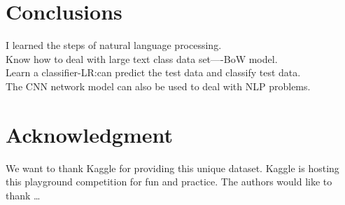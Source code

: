 \section{Conclusions} \label{sec-conclusions}
I learned the steps of natural language processing.\\
 Know how to deal with large text class data set—-BoW model.\\
Learn a classifier-LR:can predict the test data and classify test data.\\
The CNN network model can also be used to deal with NLP problems.
 
\section*{Acknowledgment}

We want to thank Kaggle for providing this unique dataset. Kaggle is hosting this playground competition for fun and practice.
The authors would like to thank \ldots\\

